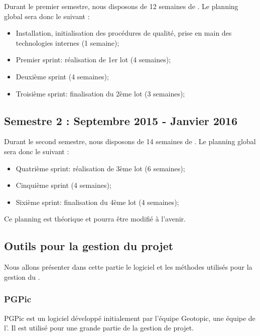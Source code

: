 Durant le premier semestre, nous disposons de 12 semaines de \PICCourt. Le planning global sera donc le suivant : 
\begin{itemize}
\item Installation, initialisation des procédures de qualité, prise en main des technologies internes (1 semaine);
\item Premier sprint: réalisation de 1er lot (4 semaines);
\item Deuxième sprint (4 semaines);
\item Troisième sprint: finalisation du 2ème lot (3 semaines);
\end{itemize}

\subsection*{Semestre 2 : Septembre 2015 - Janvier 2016}

Durant le second semestre, nous disposons de 14 semaines de \PICCourt. Le planning global sera donc le suivant : 
\begin{itemize}
\item Quatrième sprint: réalisation de 3ème lot (6 semaines);
\item Cinquième sprint (4 semaines);
\item Sixième sprint: finalisation du 4ème lot (4 semaines);\\
\end{itemize}

Ce planning est théorique et pourra être modifié à l'avenir. 

\subsection{Outils pour la gestion du projet}

Nous allons présenter dans cette partie le logiciel et les méthodes utilisés pour la gestion du \PICCourt. \\

\subsubsection*{PGPic}

PGPic est un logiciel développé initialement par l'équipe Geotopic, une équipe \PICCourt de l'\INSACourt. Il est utilisé pour une grande partie de la gestion de projet. \\

